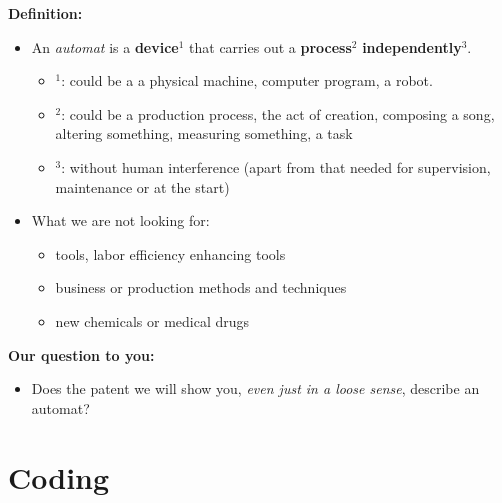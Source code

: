 \documentclass[10pt]{beamer}
\begin{document}
\begin{frame}
\textcolor{beamer@blendedblue}{\textbf{Definition:}}

	\begin{itemize}	
	\item An \textit{automat} is a \textbf{device}$^1$ that carries out a \textbf{process}$^2$ \textbf{independently}$^3$.
		\begin{itemize}	
		\item $^1$: could be a a physical machine, computer program, a robot.
		\item $^2$: could be a production process, the act of creation, composing a song, altering something, measuring something, a task
		\item $^3$: without human interference (apart from that needed for supervision, maintenance or at the start)
		\end{itemize}
		\item What we are not looking for: 
			\begin{itemize}
			\item tools, labor efficiency enhancing tools
			\item business or production methods and techniques
			\item new chemicals or medical drugs
			\end{itemize}			
	\end{itemize}
\vspace{0.6cm}
\textcolor{beamer@blendedblue}{\textbf{Our question to you:}}
	\begin{itemize}	
	\item Does the patent we will show you, \textit{even just in a loose sense}, describe an automat?
	\end{itemize}
\end{frame}



\section{Coding}
\setcounter{subsection}{1} %
\end{document}

